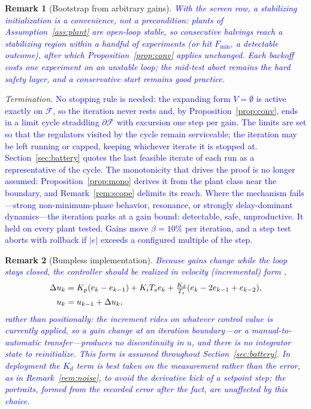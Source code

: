 \documentclass[final,3p,times,twocolumn]{elsarticle}
\newcommand{\rev}[1]{\textcolor{blue}{#1}}  %
\newcommand{\revb}[1]{\textcolor{blue}{#1}} %
\newcommand{\revc}[1]{\textcolor{blue}{#1}} %
\newcommand{\reve}[1]{\textcolor{blue}{#1}} %
\newcommand{\revh}[1]{\textcolor{blue}{#1}} %
\newtheorem{remark}{Remark}
\begin{document}
\begin{remark}[Bootstrap from arbitrary gains]\label{rem:bootstrap}
\rev{With the screen row, a stabilizing initialization is a
convenience, not a precondition: plants of Assumption~\ref{ass:plant}
are open-loop stable, so consecutive halvings reach a stabilizing region
within a handful of experiments (or hit $F_{\min}$, a detectable
outcome), after which Proposition~\ref{prop:conv} applies unchanged.
Each backoff costs one experiment on an unstable loop; the mid-test
abort remains the hard safety layer, and a conservative start remains
good practice.}
\end{remark}

\emph{Termination.} \rev{No stopping rule is needed: the expanding form
$V = \emptyset$ is active exactly on $\mathcal F$, so the iteration
never rests and, by Proposition~\ref{prop:conv}, ends in a limit cycle
straddling $\partial\mathcal F$ with excursion one step per gain. The \revc{limits are set so that the regulators visited by the
cycle remain serviceable;}
the iteration may be left running or capped, keeping whichever iterate
it is stopped at. Section~\ref{sec:battery} quotes the last feasible
iterate of each run as a representative of the cycle.} \revb{The monotonicity that drives the proof is no longer
assumed: Proposition~\ref{prop:mono} derives it from the plant class
near the boundary, and Remark~\ref{rem:scope} delimits its reach.
Where the mechanism fails---strong non-minimum-phase behavior,
resonance, or strongly delay-dominant dynamics---the iteration parks at
a gain bound: detectable, safe, unproductive. It held on every plant
tested. Gains move $\beta = 10\%$ per iteration, and a step test
aborts with rollback if $|e|$ exceeds a configured multiple of the
step.}

\begin{remark}[Bumpless implementation]\label{rem:velocity}
\rev{Because gains change while the loop stays closed, the controller
should be realized in \emph{velocity} (incremental) form}\revh{
\cite{AstromHagglundBook2006}}\rev{,}
\begin{align}
\Delta u_k &= K_p(e_k - e_{k-1}) + K_i T_s e_k
+ \tfrac{K_d}{T_s}(e_k - 2e_{k-1} + e_{k-2}), \notag\\
u_k &= u_{k-1} + \Delta u_k,
\label{eq:velocity}
\end{align}
\rev{rather than positionally: the increment rides on whatever control
value is currently applied, so a gain change at an iteration
boundary---or a manual-to-automatic transfer---produces no discontinuity
in $u$, and there is no integrator state to reinitialize. This form is
assumed throughout Section~\ref{sec:battery}.} \reve{In deployment the
$K_d$ term is best taken on the measurement rather than the error, as
in Remark~\ref{rem:noise}, to avoid the derivative kick of a setpoint
step; the portraits, formed from the recorded error after the fact,
are unaffected by this choice.}
\end{remark}
\end{document}
